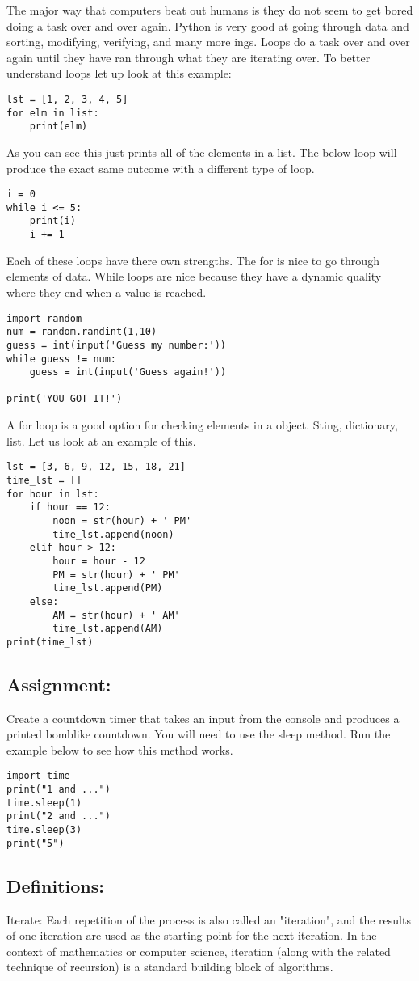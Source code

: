 \documentclass[../main.tex]{subfiles}
\begin{document}
The major way that computers beat out humans is they do not seem to get bored doing a task over and over again. Python is very good at going through data and sorting, modifying, verifying, and many more ings. Loops do a task over and over again until they have ran through what they are iterating over. To better understand loops let up look at this example:
\begin{lstlisting}[caption=For Loop]
lst = [1, 2, 3, 4, 5]
for elm in list:
    print(elm)
\end{lstlisting}
As you can see this just prints all of the elements in a list. The below loop will produce the exact same outcome with a different type of loop.
\begin{lstlisting}
i = 0
while i <= 5:
    print(i)
    i += 1
\end{lstlisting}
Each of these loops have there own strengths. The for is nice to go through elements of data. While loops are nice because they have a dynamic quality where they end when a value is reached.
\begin{lstlisting}
import random
num = random.randint(1,10)
guess = int(input('Guess my number:'))
while guess != num:
    guess = int(input('Guess again!'))

print('YOU GOT IT!')
\end{lstlisting}
A for loop is a good option for checking elements in a object. Sting, dictionary, list. Let us look at an example of this.
\begin{lstlisting}
lst = [3, 6, 9, 12, 15, 18, 21]
time_lst = []
for hour in lst:
    if hour == 12:
        noon = str(hour) + ' PM'
        time_lst.append(noon)
    elif hour > 12:
        hour = hour - 12
        PM = str(hour) + ' PM'
        time_lst.append(PM)
    else:
        AM = str(hour) + ' AM'
        time_lst.append(AM)
print(time_lst)
\end{lstlisting}
\subsection*{Assignment:}

Create a countdown timer that takes an input from the console and produces a printed bomblike countdown. You will need to use the sleep method. Run the example below to see how this method works.
\begin{lstlisting}
import time
print("1 and ...")
time.sleep(1)
print("2 and ...")
time.sleep(3)
print("5")
\end{lstlisting}
\subsection*{Definitions:}
Iterate: Each repetition of the process is also called an "iteration", and the results of one iteration are used as the starting point for the next iteration. In the context of mathematics or computer science, iteration (along with the
related technique of recursion) is a standard building block of algorithms.

\newpage
\end{document}
